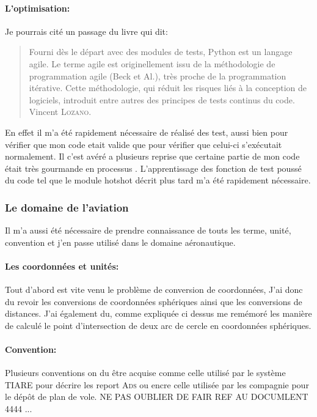             \paragraph{L'optimisation:}
Je pourrais cité un passage du livre qui dit:
\begin{quotation}
Fourni dès le départ avec des modules de tests, Python est un langage agile. Le terme agile est originellement issu de la méthodologie de programmation agile (Beck et Al.), très proche de la programmation itérative. Cette méthodologie, qui réduit les risques liés à la conception de logiciels, introduit entre autres des principes de tests continus du code.
\raggedleft Vincent \textsc{Lozano}.
\end{quotation}

En effet il m'a été rapidement nécessaire de réalisé des test, aussi bien pour vérifier que mon code etait valide que pour vérifier que celui-ci s’exécutait normalement. Il c'est avéré a plusieurs reprise que certaine partie de mon code était très gourmande en processus %
. L’apprentissage des fonction de test poussé du code tel que le module hotshot décrit plus tard %
m'a été rapidement nécessaire.

        \subsubsection{Le domaine de l'aviation}
Il m'a aussi été nécessaire de prendre connaissance de touts les terme, unité, convention et j'en passe utilisé dans le domaine aéronautique.

            \paragraph{Les coordonnées et unités:}
Tout d'abord est vite venu le problème de conversion de coordonnées, J'ai donc du revoir les conversions de coordonnées sphériques ainsi que les conversions de distances.
J'ai également du, comme expliquée ci dessus %
me remémoré les manière de calculé le point d'intersection de deux arc de cercle en coordonnées sphériques.

           \paragraph{Convention:}
Plusieurs conventions on du être acquise comme celle utilisé par le système TIARE pour décrire les report \textsc{Ads} ou encre celle utilisée par les compagnie pour le dépôt de plan de vole.
NE PAS OUBLIER DE FAIR REF AU DOCUMLENT 4444 ...

